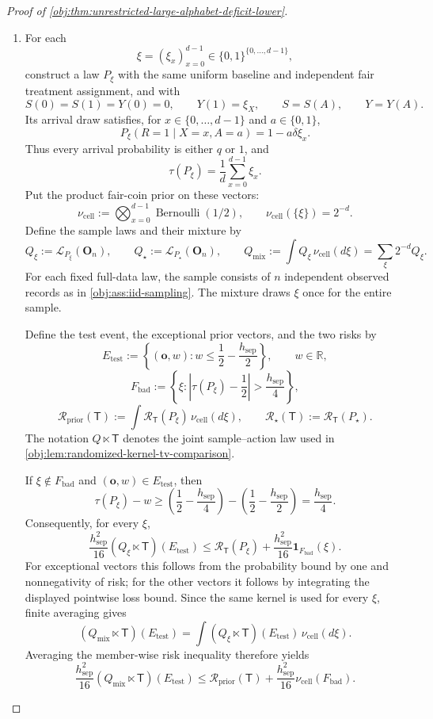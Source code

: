 \documentclass[11pt]{article}
\begin{document}
\begin{proof}[Proof of \cref{obj:thm:unrestricted-large-alphabet-deficit-lower}]
\begin{enumerate}
\item For each
\[
\xi=(\xi_x)_{x=0}^{d-1}\in\{0,1\}^{\{0,\ldots,d-1\}},
\]
construct a law \(P_\xi\) with the same uniform baseline and independent fair treatment assignment, and with
\[
S(0)=S(1)=Y(0)=0,\qquad Y(1)=\xi_X,
\qquad S=S(A),\qquad Y=Y(A).
\]
Its arrival draw satisfies, for \(x\in\{0,\ldots,d-1\}\) and \(a\in\{0,1\}\),
\[
P_\xi(R=1\mid X=x,A=a)=1-a\delta\xi_x.
\]
Thus every arrival probability is either \(q\) or \(1\), and
\[
\tau(P_\xi)
=\frac1d\sum_{x=0}^{d-1}\xi_x.
\]
Put the product fair-coin prior on these vectors:
\[
\nu_{\mathrm{cell}}
:=\bigotimes_{x=0}^{d-1}\operatorname{Bernoulli}(1/2),
\qquad
\nu_{\mathrm{cell}}(\{\xi\})=2^{-d}.
\]
Define the sample laws and their mixture by
\[
Q_\xi:=\mathcal L_{P_\xi}(\mathbf O_n),
\qquad
Q_\star:=\mathcal L_{P_\star}(\mathbf O_n),
\qquad
Q_{\mathrm{mix}}
:=\int Q_\xi\,\nu_{\mathrm{cell}}(d\xi)
=\sum_\xi2^{-d}Q_\xi.
\]
For each fixed full-data law, the sample consists of \(n\) independent observed records as in \cref{obj:ass:iid-sampling}. The mixture draws \(\xi\) once for the entire sample.

Define the test event, the exceptional prior vectors, and the two risks by
\[
E_{\mathrm{test}}
:=
\left\{(\mathbf o,w):
w\le\frac12-\frac{h_{\mathrm{sep}}}{2}\right\},
\qquad
w\in\mathbb R,
\]
\[
F_{\mathrm{bad}}
:=
\left\{\xi:
\left|\tau(P_\xi)-\frac12\right|>
\frac{h_{\mathrm{sep}}}{4}\right\},
\]
\[
\mathcal R_{\mathrm{prior}}(\mathsf T)
:=\int\mathcal R_{\mathsf T}(P_\xi)\,\nu_{\mathrm{cell}}(d\xi),
\qquad
\mathcal R_\star(\mathsf T):=\mathcal R_{\mathsf T}(P_\star).
\]
The notation \(Q\ltimes\mathsf T\) denotes the joint sample--action law used in
\cref{obj:lem:randomized-kernel-tv-comparison}.

If \(\xi\notin F_{\mathrm{bad}}\) and \((\mathbf o,w)\in E_{\mathrm{test}}\), then
\[
\tau(P_\xi)-w
\ge
\left(\frac12-\frac{h_{\mathrm{sep}}}{4}\right)
-\left(\frac12-\frac{h_{\mathrm{sep}}}{2}\right)
=\frac{h_{\mathrm{sep}}}{4}.
\]
Consequently, for every \(\xi\),
\[
\frac{h_{\mathrm{sep}}^2}{16}
(Q_\xi\ltimes\mathsf T)(E_{\mathrm{test}})
\le
\mathcal R_{\mathsf T}(P_\xi)
+\frac{h_{\mathrm{sep}}^2}{16}
\mathbf1_{F_{\mathrm{bad}}}(\xi).
\]
For exceptional vectors this follows from the probability bound by one and nonnegativity of risk; for the other vectors it follows by integrating the displayed pointwise loss bound. Since the same kernel is used for every \(\xi\), finite averaging gives
\[
(Q_{\mathrm{mix}}\ltimes\mathsf T)(E_{\mathrm{test}})
=
\int
(Q_\xi\ltimes\mathsf T)(E_{\mathrm{test}})
\,\nu_{\mathrm{cell}}(d\xi).
\]
Averaging the member-wise risk inequality therefore yields
\[
\frac{h_{\mathrm{sep}}^2}{16}
(Q_{\mathrm{mix}}\ltimes\mathsf T)(E_{\mathrm{test}})
\le
\mathcal R_{\mathrm{prior}}(\mathsf T)
+\frac{h_{\mathrm{sep}}^2}{16}\nu_{\mathrm{cell}}(F_{\mathrm{bad}}).
\]


\end{enumerate}
\end{proof}
\end{document}
